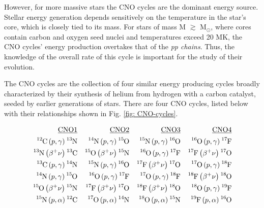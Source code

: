 However, for more massive stars the CNO cycles are the dominant energy source. Stellar energy generation depends sensitively on the temperature in the star's core, which is closely tied to its mass. For stars of mass M $\gtrsim$ M$_{\odot}$, where cores contain carbon and oxygen seed nuclei and temperatures exceed 20 MK, the CNO cycles' energy production overtakes that of the \textit{pp chains}. Thus, the knowledge of the overall rate of this cycle is important for the study of their evolution. 

The CNO cycles are the collection of four similar energy producing cycles broadly characterized by their synthesis of helium from hydrogen with a carbon catalyst, seeded by earlier generations of stars. There are four CNO cycles, listed below with their relationships shown in Fig. \ref{fig: CNO-cycles}.

\begin{align*}
\underline{\mathrm{CNO1}} & & \underline{\mathrm{CNO2}} & &\underline{\mathrm{CNO3}}  & & \underline{\mathrm{CNO4}} & \\
\ce{^{12}C} \left( p, \gamma \right) \ce{^{13}N} & & \ce{^{14}N} \left( p, \gamma \right) \ce{^{15}O} & & \ce{^{15}N} \left( p, \gamma \right) \ce{^{16}O} & & \ce{^{16}O} \left( p, \gamma \right) \ce{^{17}F}\\
\ce{^{13}N} \left( \beta^{+} \nu \right) \ce{^{13}C} & & \ce{^{15}O} \left( \beta^{+} \nu \right) \ce{^{15}N} & & \ce{^{16}O} \left( p, \gamma \right) \ce{^{17}F} & & \ce{^{17}F} \left( \beta^{+} \nu \right) \ce{^{17}O} \\
\ce{^{13}C} \left( p, \gamma \right) \ce{^{14}N} & & \ce{^{15}N} \left( p, \gamma \right) \ce{^{16}O} & & \ce{^{17}F} \left( \beta^{+} \nu \right) \ce{^{17}O} & & \ce{^{17}O} \left( p, \gamma \right) \ce{^{18}F}\\
\ce{^{14}N} \left( p, \gamma \right) \ce{^{15}O} & & \ce{^{16}O} \left( p, \gamma \right) \ce{^{17}F} & & \ce{^{17}O} \left( p, \gamma \right) \ce{^{18}F} & & \ce{^{18}F} \left( \beta^{+} \nu \right) \ce{^{18}O} \\
\ce{^{15}O} \left( \beta^{+} \nu \right) \ce{^{15}N} & & \ce{^{17}F} \left( \beta^{+} \nu \right) \ce{^{17}O} & & \ce{^{18}F} \left( \beta^{+} \nu \right) \ce{^{18}O} & & \ce{^{18}O} \left( p, \gamma \right) \ce{^{19}F}\\
\ce{^{15}N} \left( p, \alpha \right) \ce{^{12}C} & & \ce{^{17}O} \left( p, \alpha \right) \ce{^{14}N} & & \ce{^{18}O} \left( p, \alpha \right) \ce{^{15}N} & & \ce{^{19}F} \left( p, \alpha \right) \ce{^{16}O}
\end{align*}


